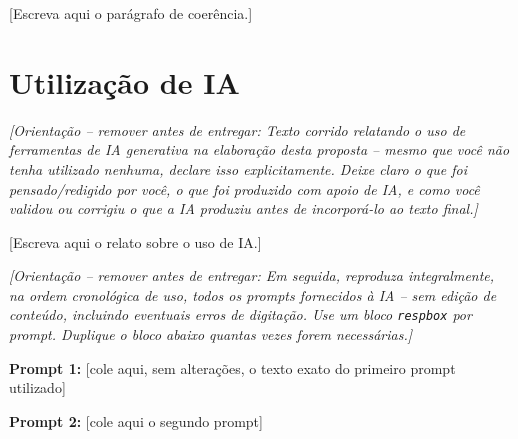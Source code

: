 \documentclass[10pt,a4paper]{extarticle}
\newcommand{\ntc}[1]{\textcolor{notice}{#1}}
\newcommand{\guia}[1]{{\small\ntc{\textit{[Orientação -- remover antes de entregar: #1]}}}}
\begin{document}
[Escreva aqui o parágrafo de coerência.]

\section{Utilização de IA}

\guia{Texto corrido relatando o uso de ferramentas de IA generativa na elaboração desta
proposta -- mesmo que você não tenha utilizado nenhuma, declare isso explicitamente. Deixe
claro o que foi pensado/redigido por você, o que foi produzido com apoio de IA, e como você
validou ou corrigiu o que a IA produziu antes de incorporá-lo ao texto final.}

[Escreva aqui o relato sobre o uso de IA.]

\guia{Em seguida, reproduza integralmente, na ordem cronológica de uso, todos os prompts
fornecidos à IA -- sem edição de conteúdo, incluindo eventuais erros de digitação. Use um
bloco \texttt{respbox} por prompt. Duplique o bloco abaixo quantas vezes forem necessárias.}

\begin{respbox}
\textbf{Prompt 1:} [cole aqui, sem alterações, o texto exato do primeiro prompt utilizado]
\end{respbox}

\begin{respbox}
\textbf{Prompt 2:} [cole aqui o segundo prompt]
\end{respbox}

%
%
\end{document}
